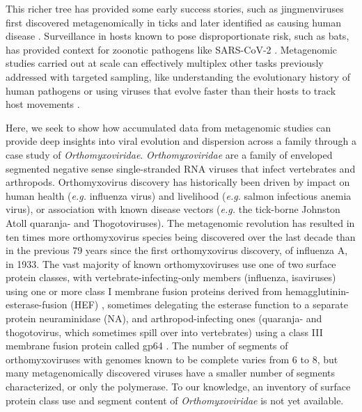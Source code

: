 \documentclass[11pt,twocolumn]{article}
\begin{document}
This richer tree has provided some early success stories, such as jingmenviruses first discovered metagenomically in ticks \citep{qin_tick-borne_2014} and later identified as causing human disease \citep{wang_new_2019}. Surveillance in hosts known to pose disproportionate risk, such as bats, \citep{ge_coexistence_2016} has provided context for zoonotic pathogens like SARS-CoV-2 \citep{wu_new_2020}.
Metagenomic studies carried out at scale can effectively multiplex other tasks previously addressed with targeted sampling, like understanding the evolutionary history of human pathogens \citep{keele_chimpanzee_2006} or using viruses that evolve faster than their hosts to track host movements \citep{wheeler_spatial_2010}.

Here, we seek to show how accumulated data from metagenomic studies can provide deep insights into viral evolution and dispersion across a family through a case study of \textit{Orthomyxoviridae}. \textit{Orthomyxoviridae} are a family of enveloped segmented negative sense single-stranded RNA viruses that infect vertebrates and arthropods.
Orthomyxovirus discovery has historically been driven by impact on human health (\textit{e.g.} influenza virus) and livelihood (\textit{e.g.} salmon infectious anemia virus), or association with known disease vectors (\textit{e.g.} the tick-borne Johnston Atoll quaranja- and Thogotoviruses). The metagenomic revolution has resulted in ten times more orthomyxovirus species being discovered over the last decade than in the previous 79 years since the first orthomyxovirus discovery, of influenza A, in 1933. The vast majority of known orthomyxoviruses use one of two surface protein classes, with vertebrate-infecting-only members (influenza, isaviruses) using one or more class I membrane fusion proteins derived from hemagglutinin-esterase-fusion (HEF) \citep{parry_divergent_2020}, sometimes delegating the esterase function to a separate protein neuraminidase (NA), and arthropod-infecting ones (quaranja- and thogotovirus, which sometimes spill over into vertebrates) using a class III membrane fusion protein called gp64 \citep{garry_proteomics_2008}. The number of segments of orthomyxoviruses with genomes known to be complete varies from 6 to 8, but many metagenomically discovered viruses have a smaller number of segments characterized, or only the polymerase. To our knowledge, an inventory of surface protein class use and segment content of \textit{Orthomyxoviridae} is not yet available.
\end{document}
